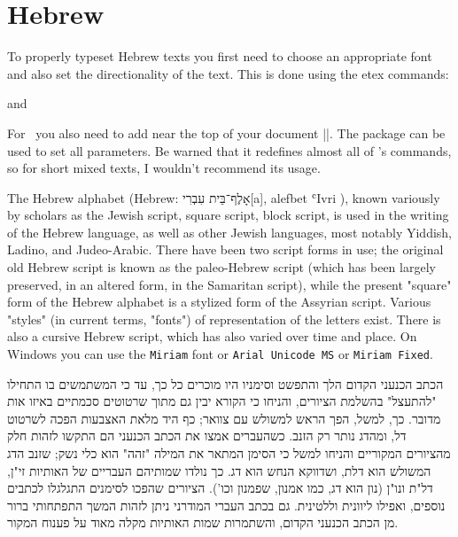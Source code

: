 \section{Hebrew}
\label{s:hebrew}



To properly typeset Hebrew texts you first need to choose an appropriate font and also set the directionality of the text. This
is done using the etex commands:

\CMDI{\beginL} and \CMDI{\beginR} 

For \XeTeX\ you also need to add near the top of your document ||. The package  can be used to set all parameters. Be warned that it redefines almost all of \latexe's commands, so for short mixed texts, I wouldn't recommend its usage. 



The Hebrew alphabet (Hebrew: אָלֶף־בֵּית עִבְרִי[a], alefbet ʿIvri ), known variously by scholars as the Jewish script, square script, block script, is used in the writing of the Hebrew language, as well as other Jewish languages, most notably Yiddish, Ladino, and Judeo-Arabic. There have been two script forms in use; the original old Hebrew script is known as the paleo-Hebrew script (which has been largely preserved, in an altered form, in the Samaritan script), while the present "square" form of the Hebrew alphabet is a stylized form of the Assyrian script. Various "styles" (in current terms, "fonts") of representation of the letters exist. There is also a cursive Hebrew script, which has also varied over time and place. On Windows you can use the \texttt{Miriam} font or \texttt{Arial Unicode MS} or \texttt{Miriam Fixed}.
\medskip

\topline
\bgroup
\ifxetex{}\fi
\raggedleft\hebrew{}\beginR

הכתב הכנעני הקדום הלך והתפשט וסימניו היו מוכרים כל כך, עד כי המשתמשים בו התחילו "להתעצל" בהשלמת הציורים, והניחו כי הקורא יבין גם מתוך שרטוטים סכמתיים באיזו אות מדובר. כך, למשל, הפך הראש למשולש עם צוואר; כף היד מלאת האצבעות הפכה לשרטוט דל, ומהדג נותר רק הזנב. כשהעברים אמצו את הכתב הכנעני הם התקשו לזהות חלק מהציורים המקוריים והניחו למשל כי הסימן המתאר את המילה "זהה" הוא כלי נשק; שזנב הדג המשולש הוא דלת, ושדווקא הנחש הוא דג. כך נולדו שמותיהם העבריים של האותיות זי"ן, דל"ת ונו"ן (נון הוא דג, כמו אמנון, שפמנון וכו'). הציורים שהפכו לסימנים התגלגלו לכתבים נוספים, ואפילו ליוונית וללטינית. גם בכתב העברי המודרני ניתן לזהות המשך התפתחותי ברור מן הכתב הכנעני הקדום, והשתמרות שמות האותיות מקלה מאוד על פענוח המקור.


